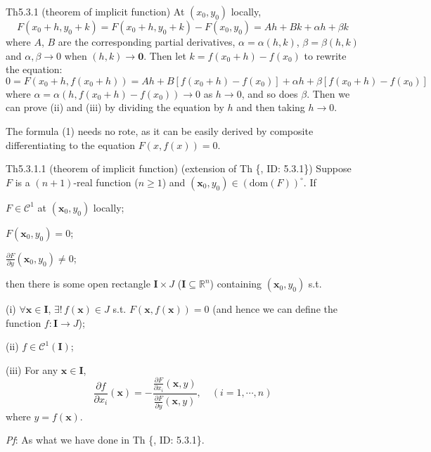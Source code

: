\documentclass{article}
\newcommand{\parfrac}[2]{\frac{\partial #1}{\partial #2}}
\begin{document}
\begin{Th}{Th5.3.1 (theorem of implicit function)}
    At $(x_0, y_0)$ locally,
    $$ F(x_0+h, y_0+k) = F(x_0+h, y_0+k) - F(x_0, y_0) = Ah + Bk + \alpha h+\beta k $$
    where $A$, $B$ are the corresponding partial derivatives, $\alpha = \alpha (h,k)$, $\beta = \beta (h,k)$ and $\alpha, \beta\rightarrow 0$ when $(h,k)\rightarrow\pmb{0}$. Then let $k = f(x_0+h)-f(x_0)$ to rewrite the equation:
    $$ 0 = F(x_0+h, f(x_0+h)) = Ah + B[f(x_0+h)-f(x_0)] + \alpha h+\beta [f(x_0+h)-f(x_0)] $$
    where $\alpha = \alpha (h, f(x_0+h)-f(x_0))\rightarrow 0$ as $h\rightarrow 0$, and so does $\beta$. Then we can prove (ii) and (iii) by dividing the equation by $h$ and then taking $h\rightarrow 0$.
\end{Th}

\begin{Rmk}{}
    The formula (1) needs no rote, as it can be easily derived by composite differentiating to the equation $F(x,f(x)) = 0$.
\end{Rmk}

\begin{Th}{Th5.3.1.1 (theorem of implicit function) (extension of Th \{, ID: 5.3.1\})}
    Suppose $F$ is a $(n+1)$-real function ($n\geq 1$) and $(\pmb{x}_0, y_0)\in (\text{dom}(F))^\circ$. If
    \begin{compactenum}
        \item $F\in\mathcal{C}^1$ at $(\pmb{x}_0, y_0)$ locally;
        \item $F(\pmb{x}_0, y_0) = 0$;
        \item $\parfrac{F}{y}(\pmb{x}_0, y_0)\neq 0$;
    \end{compactenum}
    then there is some open rectangle $\pmb{I}\times J$ ($\pmb{I}\subseteq\mathbb{R}^n$) containing $(\pmb{x}_0, y_0)$ s.t.
    \begin{compactenum}
        \item[(i)] $\forall \pmb{x}\in \pmb{I}$, $\exists!\, f(\pmb{x})\in J$ s.t. $F(\pmb{x}, f(\pmb{x})) = 0$ (and hence we can define the function $f: \pmb{I}\rightarrow J$);
        \item[(ii)] $f\in\mathcal{C}^1(\pmb{I})$;
        \item[(iii)] For any $\pmb{x}\in\pmb{I}$,
        $$ \parfrac{f}{x_i}(\pmb{x}) = -\frac{\parfrac{F}{x_i}(\pmb{x}, y)}{\parfrac{F}{y}(\pmb{x}, y)}, \quad (i=1, \cdots, n)$$
        where $y=f(\pmb{x})$.
    \end{compactenum}
    \tcblower
    \textit{Pf}: As what we have done in Th \{, ID: 5.3.1\}.
\end{Th}
\end{document}
